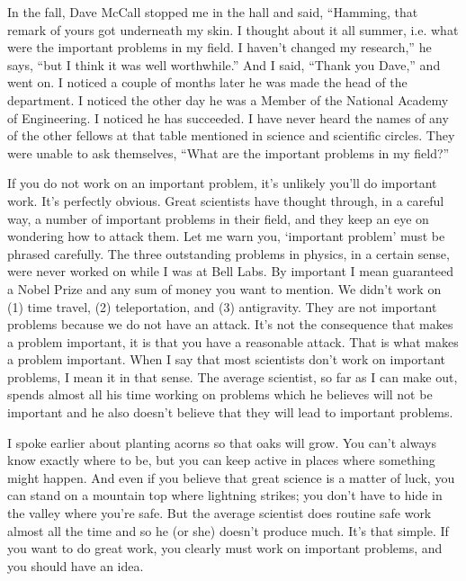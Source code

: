 \documentclass{article}
\begin{document}
In the fall, Dave McCall stopped me in the hall and said, ``Hamming, that remark of yours got underneath my skin. I thought about it all summer, i.e. what were the important problems in my field. I haven't changed my research,'' he says, ``but I think it was well worthwhile.'' And I said, ``Thank you Dave,'' and went on. I noticed a couple of months later he was made the head of the department. I noticed the other day he was a Member of the National Academy of Engineering. I noticed he has succeeded. I have never heard the names of any of the other fellows at that table mentioned in science and scientific circles. They were unable to ask themselves, ``What are the important problems in my field?''

If you do not work on an important problem, it's unlikely you'll do important work. It's perfectly obvious. Great scientists have thought through, in a careful way, a number of important problems in their field, and they keep an eye on wondering how to attack them. Let me warn you, `important problem' must be phrased carefully. The three outstanding problems in physics, in a certain sense, were never worked on while I was at Bell Labs. By important I mean guaranteed a Nobel Prize and any sum of money you want to mention. We didn't work on (1) time travel, (2) teleportation, and (3) antigravity. They are not important problems because we do not have an attack. It's not the consequence that makes a problem important, it is that you have a reasonable attack. That is what makes a problem important. When I say that most scientists don't work on important problems, I mean it in that sense. The average scientist, so far as I can make out, spends almost all his time working on problems which he believes will not be important and he also doesn't believe that they will lead to important problems.

I spoke earlier about planting acorns so that oaks will grow. You can't always know exactly where to be, but you can keep active in places where something might happen. And even if you believe that great science is a matter of luck, you can stand on a mountain top where lightning strikes; you don't have to hide in the valley where you're safe. But the average scientist does routine safe work almost all the time and so he (or she) doesn't produce much. It's that simple. If you want to do great work, you clearly must work on important problems, and you should have an idea.
\end{document}
